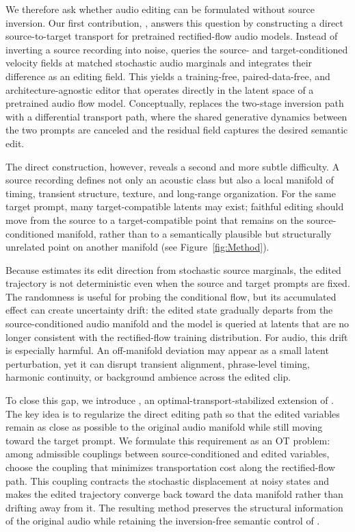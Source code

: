 We therefore ask whether audio editing can be formulated without source inversion.
Our first contribution, \method, answers this question by constructing a direct source-to-target transport for pretrained rectified-flow audio models.
Instead of inverting a source recording into noise, \method queries the source- and target-conditioned velocity fields at matched stochastic audio marginals and integrates their difference as an editing field.
This yields a training-free, paired-data-free, and architecture-agnostic editor that operates directly in the latent space of a pretrained audio flow model.
Conceptually, \method replaces the two-stage inversion path with a differential transport path, where the shared generative dynamics between the two prompts are canceled and the residual field captures the desired semantic edit.

The direct construction, however, reveals a second and more subtle difficulty.
A source recording defines not only an acoustic class but also a local manifold of timing, transient structure, texture, and long-range organization.
For the same target prompt, many target-compatible latents may exist; faithful editing should move from the source to a target-compatible point that remains on the source-conditioned manifold, rather than to a semantically plausible but structurally unrelated point on another manifold (see Figure~\ref{fig:Method}).

Because \method estimates its edit direction from stochastic source marginals, the edited trajectory is not deterministic even when the source and target prompts are fixed.
The randomness is useful for probing the conditional flow, but its accumulated effect can create uncertainty drift: the edited state gradually departs from the source-conditioned audio manifold and the model is queried at latents that are no longer consistent with the rectified-flow training distribution.
For audio, this drift is especially harmful.
An off-manifold deviation may appear as a small latent perturbation, yet it can disrupt transient alignment, phrase-level timing, harmonic continuity, or background ambience across the edited clip.

To close this gap, we introduce \methodplus, an optimal-transport-stabilized extension of \method.
The key idea is to regularize the direct editing path so that the edited variables remain as close as possible to the original audio manifold while still moving toward the target prompt.
We formulate this requirement as an OT problem: among admissible couplings between source-conditioned and edited variables, choose the coupling that minimizes transportation cost along the rectified-flow path.
This coupling contracts the stochastic displacement at noisy states and makes the edited trajectory converge back toward the data manifold rather than drifting away from it.
The resulting method preserves the structural information of the original audio while retaining the inversion-free semantic control of \method.

